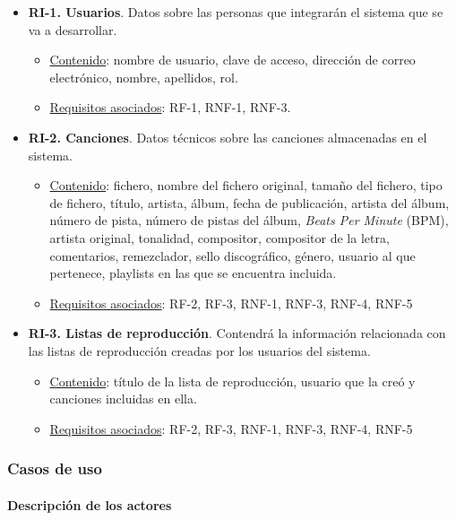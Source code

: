 \begin{itemize}
	\item \textbf{RI-1. Usuarios}. Datos sobre las personas que integrarán el sistema que se va a desarrollar.
	\begin{itemize}
		\item \underline{Contenido}: nombre de usuario, clave de acceso, dirección de correo electrónico, nombre, apellidos, rol.
		\item \underline{Requisitos asociados}: RF-1, RNF-1, RNF-3.
	\end{itemize}
	
	\item \textbf{RI-2. Canciones}. Datos técnicos sobre las canciones almacenadas en el sistema.
	\begin{itemize}
		\item \underline{Contenido}: fichero, nombre del fichero original, tamaño del fichero, tipo de fichero, título, artista, álbum, fecha de publicación, artista del álbum, número de pista, número de pistas del álbum, \textit{Beats Per Minute} (BPM), artista original, tonalidad, compositor, compositor de la letra, comentarios, remezclador, sello discográfico, género, usuario al que pertenece, playlists en las que se encuentra incluida.
		\item \underline{Requisitos asociados}: RF-2, RF-3, RNF-1, RNF-3, RNF-4, RNF-5
	\end{itemize}
	
	\item \textbf{RI-3. Listas de reproducción}. Contendrá la información relacionada con las listas de reproducción creadas por los usuarios del sistema.
	\begin{itemize}
		\item \underline{Contenido}: título de la lista de reproducción, usuario que la creó y canciones incluidas en ella.
		\item \underline{Requisitos asociados}: RF-2, RF-3, RNF-1, RNF-3, RNF-4, RNF-5
	\end{itemize}
	
\end{itemize}

\subsubsection{Casos de uso}

\paragraph{Descripción de los actores}

